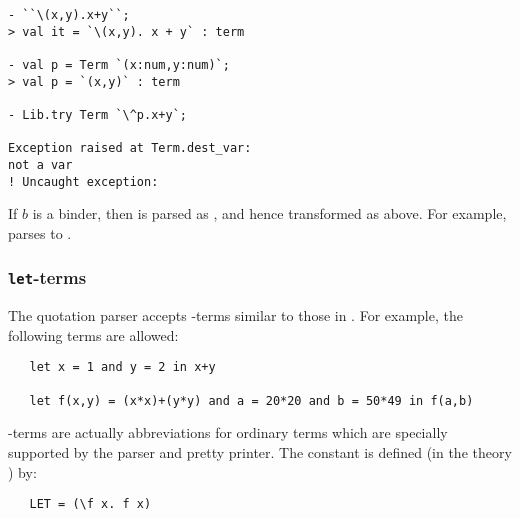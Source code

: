 \begin{session}
\begin{verbatim}
- ``\(x,y).x+y``;
> val it = `\(x,y). x + y` : term

- val p = Term `(x:num,y:num)`;
> val p = `(x,y)` : term

- Lib.try Term `\^p.x+y`;

Exception raised at Term.dest_var:
not a var
! Uncaught exception:
\end{verbatim}
\end{session}

If $b$ is a binder, then  is parsed as
, and hence transformed as above.  For
example,
parses to
.


\subsubsection{\texttt{let}-terms}
\label{let-exp}

The quotation parser
%
%
accepts -terms
similar to those in \ML. For example, the following terms are allowed:

\begin{hol}
\begin{verbatim}
   let x = 1 and y = 2 in x+y

   let f(x,y) = (x*x)+(y*y) and a = 20*20 and b = 50*49 in f(a,b)
\end{verbatim}
\end{hol}

-terms are actually abbreviations for ordinary terms which are
specially supported by the parser and pretty printer.
The constant 
 is defined (in the theory ) by:

\begin{hol}
{\small
\begin{verbatim}
   LET = (\f x. f x)
\end{verbatim}
}
\end{hol}

